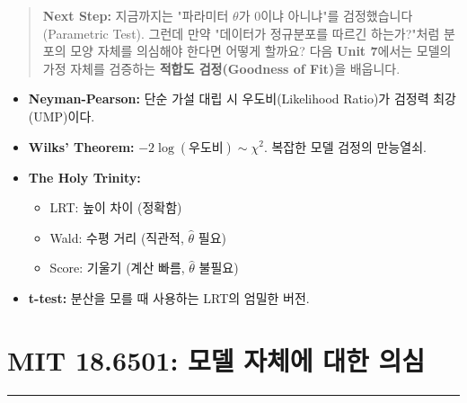 \documentclass[11pt,a4paper]{book}
\theoremstyle{definition}
\begin{document}
\vspace{1cm}
\begin{quote}
\textbf{Next Step:} 지금까지는 "파라미터 $\theta$가 0이냐 아니냐"를 검정했습니다(Parametric Test). 그런데 만약 "데이터가 정규분포를 따르긴 하는가?"처럼 분포의 모양 자체를 의심해야 한다면 어떻게 할까요? 다음 \textbf{Unit 7}에서는 모델의 가정 자체를 검증하는 \textbf{적합도 검정(Goodness of Fit)}을 배웁니다.
\end{quote}

\begin{summarybox}[title={Unit 6 핵심 요약}]
\begin{itemize}
    \item \textbf{Neyman-Pearson:} 단순 가설 대립 시 우도비(Likelihood Ratio)가 검정력 최강(UMP)이다.
    \item \textbf{Wilks' Theorem:} $-2 \log (\text{우도비}) \sim \chi^2$. 복잡한 모델 검정의 만능열쇠.
    \item \textbf{The Holy Trinity:}
    \begin{itemize}
        \item LRT: 높이 차이 (정확함)
        \item Wald: 수평 거리 (직관적, $\hat{\theta}$ 필요)
        \item Score: 기울기 (계산 빠름, $\hat{\theta}$ 불필요)
    \end{itemize}
    \item \textbf{t-test:} 분산을 모를 때 사용하는 LRT의 엄밀한 버전.
\end{itemize}
\end{summarybox}


\chapter{MIT 18.6501: 모델 자체에 대한 의심}
\label{ch:lecture7}


\vspace{1cm}
\hrule
\vspace{1cm}
\end{document}
